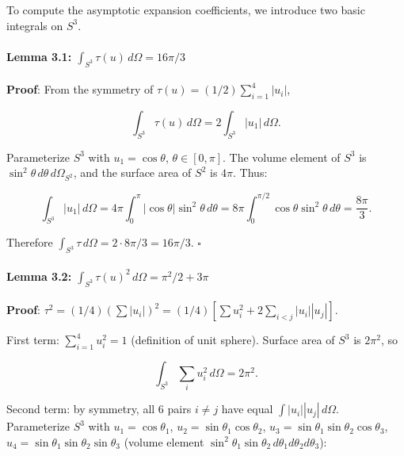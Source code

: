 \documentclass[
]{article}
\begin{document}
To compute the asymptotic expansion coefficients, we introduce two basic
integrals on \(S^3\).

\paragraph{\texorpdfstring{Lemma 3.1:
\(\int_{S^3} \tau(u) \, d\Omega = 16\pi/3\)}{Lemma 3.1: \textbackslash int\_\{S\^{}3\} \textbackslash tau(u) \textbackslash, d\textbackslash Omega = 16\textbackslash pi/3}}\label{lemma-3.1-int_s3-tauu-domega-16pi3}

\textbf{Proof}: From the symmetry of
\(\tau(u) = (1/2)\sum_{i=1}^4 |u_i|\),

\[\int_{S^3} \tau(u) \, d\Omega = 2 \int_{S^3} |u_1| \, d\Omega.\]

Parameterize \(S^3\) with \(u_1 = \cos\theta\), \(\theta \in [0, \pi]\).
The volume element of \(S^3\) is
\(\sin^2\theta \, d\theta \, d\Omega_{S^2}\), and the surface area of
\(S^2\) is \(4\pi\). Thus:

\[\int_{S^3} |u_1| \, d\Omega = 4\pi \int_0^\pi |\cos\theta| \sin^2\theta \, d\theta = 8\pi \int_0^{\pi/2} \cos\theta \sin^2\theta \, d\theta = \frac{8\pi}{3}.\]

Therefore \(\int_{S^3} \tau \, d\Omega = 2 \cdot 8\pi/3 = 16\pi/3\).
\(\square\)

\paragraph{\texorpdfstring{Lemma 3.2:
\(\int_{S^3} \tau(u)^2 \, d\Omega = \pi^2/2 + 3\pi\)}{Lemma 3.2: \textbackslash int\_\{S\^{}3\} \textbackslash tau(u)\^{}2 \textbackslash, d\textbackslash Omega = \textbackslash pi\^{}2/2 + 3\textbackslash pi}}\label{lemma-3.2-int_s3-tauu2-domega-pi22-3pi}

\textbf{Proof}:
\(\tau^2 = (1/4)(\sum |u_i|)^2 = (1/4)[\sum u_i^2 + 2\sum_{i<j} |u_i||u_j|]\).

First term: \(\sum_{i=1}^4 u_i^2 = 1\) (definition of unit sphere).
Surface area of \(S^3\) is \(2\pi^2\), so

\[\int_{S^3} \sum_i u_i^2 \, d\Omega = 2\pi^2.\]

Second term: by symmetry, all 6 pairs \(i \neq j\) have equal
\(\int |u_i||u_j| \, d\Omega\). Parameterize \(S^3\) with
\(u_1 = \cos\theta_1\), \(u_2 = \sin\theta_1 \cos\theta_2\),
\(u_3 = \sin\theta_1 \sin\theta_2 \cos\theta_3\),
\(u_4 = \sin\theta_1 \sin\theta_2 \sin\theta_3\) (volume element
\(\sin^2\theta_1 \sin\theta_2 \, d\theta_1 d\theta_2 d\theta_3\)):
\end{document}
